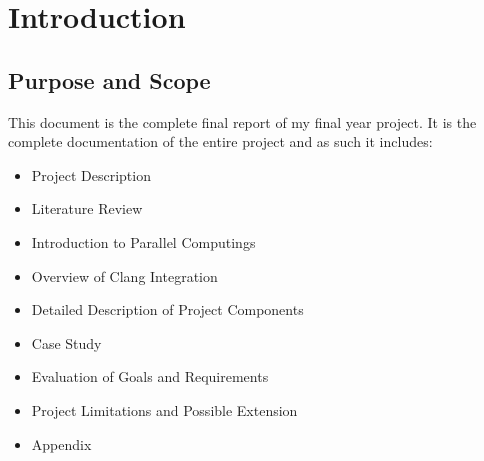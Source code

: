 
\section{Introduction} %



\subsection{Purpose and Scope} %

This document is the complete final report of my final year project. It is the complete
documentation of the entire project and as such it includes:

\begin{itemize} 
    \item Project Description
    \item Literature Review
    \item Introduction to Parallel Computings
    \item Overview of Clang Integration
    \item Detailed Description of Project Components
    \item Case Study
    \item Evaluation of Goals and Requirements
    \item Project Limitations and Possible Extension
    \item Appendix
\end{itemize}
